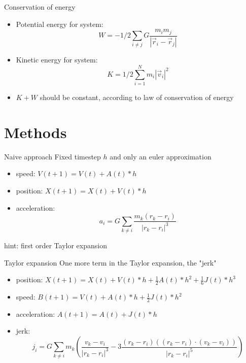 \documentclass{beamer}
\begin{document}
\begin{frame}{Conservation of energy}
    \begin{itemize}
            \item
            Potential energy for system: \begin{equation} W = - 1/2 \sum_{i \ne j} G \frac{m_i m_j}{|\vec{r}_i-\vec{r}_j|}\end{equation}
            \item
            Kinetic energy for system: \begin{equation} K=1/2 \sum_{i=1}^{N} m_i |\vec{v}_i|^2 \end{equation}
            \item
                $K+W$ should be constant, according to law of conservation of energy
    \end{itemize}
\end{frame}
\section{Methods}

\begin{frame}{Naive approach}
  Fixed timestep $h$ and only an euler approximation
  \begin{itemize}
    \item
      speed: $V(t+1) = V(t) + A(t)*h$ 
    \item
      position: $X(t+1) = X(t) + V(t)*h$
    \item
      acceleration: \begin{equation} a_i = G \sum_{k \neq i} \frac{m_k(r_k - r_i)}{|r_k - r_i|^3}\end{equation}
  \end{itemize}

  hint: first order Taylor expansion
\end{frame}

\begin{frame}{Taylor expansion}
  One more term in the Taylor expansion, the "jerk"

  \begin{itemize}
    \item
        position: $X(t+1) = X(t) + V(t)*h + \frac{1}{2} A(t)*h^2 + \frac{1}{6} J(t) * h^3$
    \item
        speed: $B(t+1) = V(t) + A(t)*h + \frac{1}{2} J(t) * h^2$
    \item
        acceleration: $A(t+1) = A(t) + J(t) * h$
    \item
        jerk: \begin{equation} j_i = G \sum_{k \neq i} m_k \left( \frac{v_k - v_i}{|r_k - r_i|^3} - 3\frac{(r_k-r_i)\left((r_k - r_i)\cdot(v_k - v_i)\right)}{|r_k - r_i|^5} \right)
        \end{equation}
  \end{itemize}
\end{frame}
\end{document}
